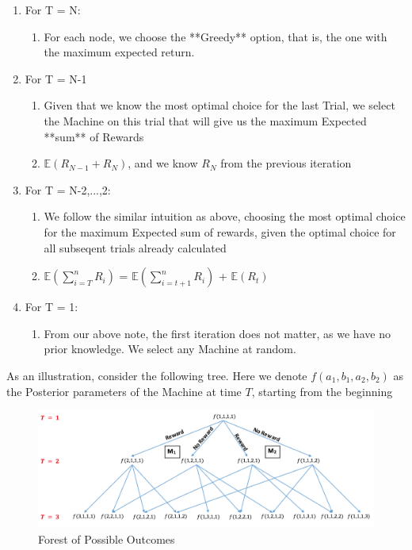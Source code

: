 \documentclass{article}
\begin{document}
\begin{enumerate}
\item For T = N:
	\begin{enumerate}
	\item For each node, we choose the **Greedy** option, that is, the one with the maximum expected return.
	\end{enumerate}
\item For T = N-1
	\begin{enumerate}
	\item Given that we know the most optimal choice for the last Trial, we select the Machine on this trial that will give us the maximum Expected **sum** of Rewards\
	\item $\mathbb{E}(R_{N-1} + R_{N})$, and we know $R_N$ from the previous iteration
	\end{enumerate}
\item For T = N-2,...,2:
	\begin{enumerate}
	\item We follow the similar intuition as above, choosing the most optimal choice for the maximum Expected sum of rewards, given the optimal choice for all subseqent trials already calculated
	\item $\mathbb{E}(\displaystyle\sum_{i=T}^{n} R_i)$ = $\mathbb{E}(\displaystyle\sum_{i=t+1}^{n} R_i)$ + $\mathbb{E}(R_t)$
	\end{enumerate}
\item For T = 1:
	\begin{enumerate}
	\item From our above note, the first iteration does not matter, as we have no prior knowledge. We select any Machine at random.
	\end{enumerate}
\end{enumerate}

As an illustration, consider the following tree. Here we denote $f(a_1, b_1, a_2, b_2)$ as the Posterior parameters of the Machine at time $T$, starting from the beginning\\

\begin{figure}[H]
\centering
\includegraphics[scale=0.75]{Dynamic_Programming_Tree.png}
\caption{Forest of Possible Outcomes}
\end{figure}
\end{document}
